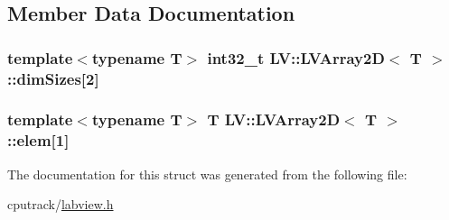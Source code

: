 \subsection{Member Data Documentation}
\subsubsection[{\texorpdfstring{dim\+Sizes}{dimSizes}}]{\setlength{\rightskip}{0pt plus 5cm}template$<$typename T$>$ int32\+\_\+t {\bf L\+V\+::\+L\+V\+Array2D}$<$ T $>$\+::dim\+Sizes\mbox{[}2\mbox{]}}\hypertarget{struct_l_v_1_1_l_v_array2_d_a7b6d976b3a06213c92e68e80e62c4925}{}\label{struct_l_v_1_1_l_v_array2_d_a7b6d976b3a06213c92e68e80e62c4925}
\subsubsection[{\texorpdfstring{elem}{elem}}]{\setlength{\rightskip}{0pt plus 5cm}template$<$typename T$>$ T {\bf L\+V\+::\+L\+V\+Array2D}$<$ T $>$\+::elem\mbox{[}1\mbox{]}}\hypertarget{struct_l_v_1_1_l_v_array2_d_a4a7eaad976cd43873e2a2a80aa1771e7}{}\label{struct_l_v_1_1_l_v_array2_d_a4a7eaad976cd43873e2a2a80aa1771e7}


The documentation for this struct was generated from the following file\+:\begin{DoxyCompactItemize}
\item 
cputrack/\hyperlink{labview_8h}{labview.\+h}\end{DoxyCompactItemize}
